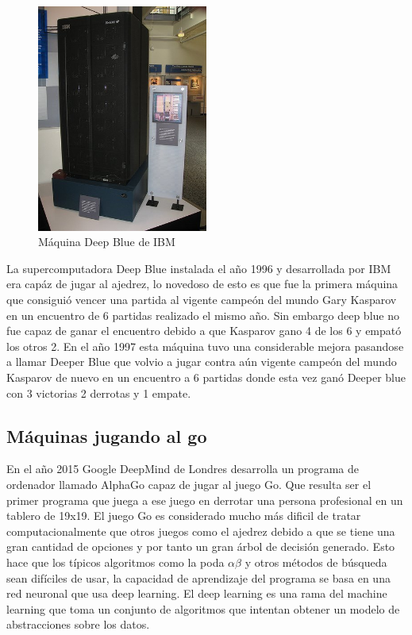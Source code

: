 \documentclass[a4paper, 11pt]{article} %
\begin{document}
\begin{figure}[H]
\centering
\includegraphics[width=0.5\textwidth]{deepblue}
\caption{Máquina Deep Blue de IBM}
\label{Ejemplo kNN}
\end{figure}

La supercomputadora Deep Blue instalada el año 1996 y desarrollada por IBM era capáz de jugar al ajedrez, lo novedoso de esto es que fue la primera máquina que consiguió vencer una partida al vigente campeón del mundo Gary Kasparov en un encuentro de 6 partidas realizado el mismo año. Sin embargo deep blue no fue capaz de ganar el encuentro debido a que Kasparov gano 4 de los 6 y empató los otros 2. En el año 1997 esta máquina tuvo una considerable mejora pasandose a llamar Deeper Blue que volvio a jugar contra aún vigente campeón del mundo Kasparov de nuevo en un encuentro a 6 partidas donde esta vez ganó Deeper blue con 3 victorias 2 derrotas y 1 empate.

\subsection{Máquinas jugando al go}

En el año 2015 Google DeepMind de Londres desarrolla un programa de ordenador llamado AlphaGo capaz de jugar al juego Go. Que resulta ser el primer programa que juega a ese juego en derrotar una persona profesional en un tablero de 19x19. El juego Go es considerado mucho más dificil de tratar computacionalmente que otros juegos como el ajedrez debido a que se tiene una gran cantidad de opciones y por tanto un gran árbol de decisión generado. Esto hace que los típicos algoritmos como la poda $\alpha\beta$ y otros métodos de búsqueda sean difíciles de usar, la capacidad de aprendizaje del programa se basa en una red neuronal que usa deep learning. El deep learning es una rama del machine learning que toma un conjunto de algoritmos que intentan obtener un modelo de abstracciones sobre los datos.
\end{document}
